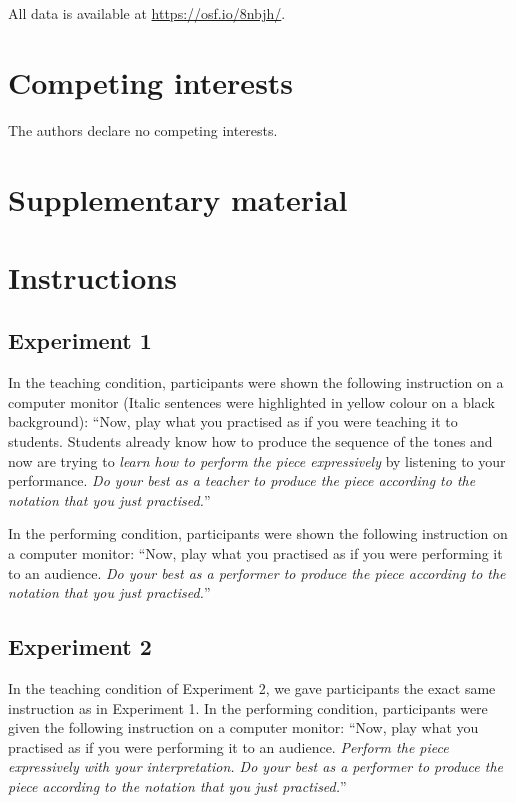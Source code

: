 \documentclass[
  man,floatsintext]{apa6}
\begin{document}
All data is available at \url{https://osf.io/8nbjh/}.

\hypertarget{competing-interests}{%
\section{Competing interests}\label{competing-interests}}

The authors declare no competing interests.

\clearpage

\hypertarget{supplementary}{%
\section{Supplementary material}\label{supplementary}}

\hypertarget{instructions}{%
\section{Instructions}\label{instructions}}

\hypertarget{experiment-1-1}{%
\subsection{Experiment 1}\label{experiment-1-1}}

In the teaching condition, participants were shown the following instruction on a computer monitor (Italic sentences were highlighted in yellow colour on a black background): ``Now, play what you practised as if you were teaching it to students. Students already know how to produce the sequence of the tones and now are trying to \emph{learn how to perform the piece expressively} by listening to your performance. \emph{Do your best as a teacher to produce the piece according to the notation that you just practised.}''

In the performing condition, participants were shown the following instruction on a computer monitor: ``Now, play what you practised as if you were performing it to an audience. \emph{Do your best as a performer to produce the piece according to the notation that you just practised.}''

\hypertarget{experiment-2-1}{%
\subsection{Experiment 2}\label{experiment-2-1}}

In the teaching condition of Experiment 2, we gave participants the exact same instruction as in Experiment 1. In the performing condition, participants were given the following instruction on a computer monitor: ``Now, play what you practised as if you were performing it to an audience. \emph{Perform the piece expressively with your interpretation. Do your best as a performer to produce the piece according to the notation that you just practised.}''
\end{document}
